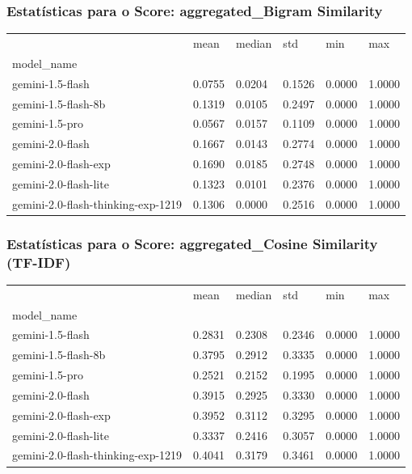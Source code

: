 \documentclass{article}%
\begin{document}
\subsubsection*{Estatísticas para o Score: aggregated\_Bigram Similarity}%
\begin{table}[H]%
\centering%
\begin{tabular}{llllll}
\toprule
 & mean & median & std & min & max \\
model_name &  &  &  &  &  \\
\midrule
gemini-1.5-flash & 0.0755 & 0.0204 & 0.1526 & 0.0000 & 1.0000 \\
gemini-1.5-flash-8b & 0.1319 & 0.0105 & 0.2497 & 0.0000 & 1.0000 \\
gemini-1.5-pro & 0.0567 & 0.0157 & 0.1109 & 0.0000 & 1.0000 \\
gemini-2.0-flash & 0.1667 & 0.0143 & 0.2774 & 0.0000 & 1.0000 \\
gemini-2.0-flash-exp & 0.1690 & 0.0185 & 0.2748 & 0.0000 & 1.0000 \\
gemini-2.0-flash-lite & 0.1323 & 0.0101 & 0.2376 & 0.0000 & 1.0000 \\
gemini-2.0-flash-thinking-exp-1219 & 0.1306 & 0.0000 & 0.2516 & 0.0000 & 1.0000 \\
\bottomrule
\end{tabular}
%
\end{table}%
\vspace{0.5cm}%
\subsubsection*{Estatísticas para o Score: aggregated\_Cosine Similarity (TF-IDF)}%
\begin{table}[H]%
\centering%
\begin{tabular}{llllll}
\toprule
 & mean & median & std & min & max \\
model_name &  &  &  &  &  \\
\midrule
gemini-1.5-flash & 0.2831 & 0.2308 & 0.2346 & 0.0000 & 1.0000 \\
gemini-1.5-flash-8b & 0.3795 & 0.2912 & 0.3335 & 0.0000 & 1.0000 \\
gemini-1.5-pro & 0.2521 & 0.2152 & 0.1995 & 0.0000 & 1.0000 \\
gemini-2.0-flash & 0.3915 & 0.2925 & 0.3330 & 0.0000 & 1.0000 \\
gemini-2.0-flash-exp & 0.3952 & 0.3112 & 0.3295 & 0.0000 & 1.0000 \\
gemini-2.0-flash-lite & 0.3337 & 0.2416 & 0.3057 & 0.0000 & 1.0000 \\
gemini-2.0-flash-thinking-exp-1219 & 0.4041 & 0.3179 & 0.3461 & 0.0000 & 1.0000 \\
\bottomrule
\end{tabular}
%
\end{table}%
\vspace{0.5cm}%
\end{document}
